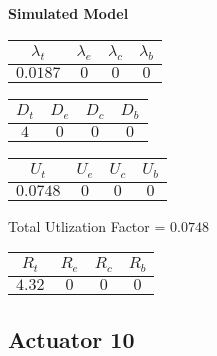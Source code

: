 \documentclass{article}
\begin{document}
\begin{minipage}{0.5\textwidth}
\centering	\textbf{Simulated Model}
\begin{table}[H]
\centering
\begin{tabular}{@{}cccc@{}}
\toprule
$\lambda_t$ & $\lambda_e$ & $\lambda_c$ & $\lambda_b$\\
\midrule
$0.0187$ & $0$ & $0$ & $0$\\
\bottomrule
\end{tabular}
\end{table}
\begin{table}[H]
\centering
\begin{tabular}{@{}cccc@{}}
\toprule
$D_t$ & $D_e$ & $D_c$ & $D_b$\\
\midrule
$4$ & $0$ & $0$ & $0$\\
\bottomrule
\end{tabular}
\end{table}\begin{table}[H]
\centering
\begin{tabular}{@{}cccc@{}}
\toprule
$U_t$ & $U_e$ & $U_c$ & $U_b$\\
\midrule
$0.0748$ & $0$ & $0$ & $0$\\
\bottomrule
\end{tabular}
\end{table}
\centering Total Utlization Factor = $0.0748$
\begin{table}[H]
\centering
\begin{tabular}{@{}cccc@{}}
\toprule
$R_t$ & $R_e$ & $R_c$ & $R_b$\\
\midrule
$4.32$ & $0$ & $0$ & $0$\\
\bottomrule
\end{tabular}
\end{table}
\end{minipage}\subsection{Actuator 10}
\end{document}
